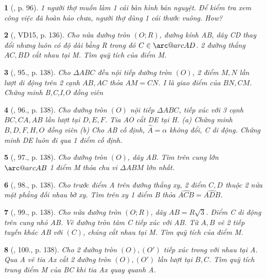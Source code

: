 \documentclass{article}
\makeatletter
\newcommand{\arc@char}{{\usefont{U}{tipa}{m}{n}\symbol{62}}}%
\newcommand{\arc}[1]{\mathpalette\arc@arc{#1}}
\newcommand{\arc@arc}[2]{%
	\sbox0{$\m@th#1#2$}%
	\vbox{
		\hbox{\resizebox{\wd0}{\height}{\arc@char}}
		\nointerlineskip
		\box0
	}%
}
\newtheorem{baitoan}{}
\makeatother
\begin{document}
\begin{baitoan}[\cite{Binh_boi_duong_Toan_9_tap_2}, p. 96]
	1 người thợ muốn làm 1 cái bàn hình bán nguyệt. Để kiểm tra xem công việc đã hoàn hảo chưa, người thợ dùng 1 cái thước vuông. How?
\end{baitoan}

\begin{baitoan}[\cite{Tuyen_Toan_9_old}, VD15, p. 136]
	Cho nửa đường tròn $(O;R)$, đường kính AB, dây CD thay đổi nhưng luôn có độ dài bằng R trong đó $C\in\arc{AD}$. 2 đường thẳng $AC,BD$ cắt nhau tại M. Tìm quỹ tích của điểm M.
\end{baitoan}

\begin{baitoan}[\cite{Tuyen_Toan_9_old}, 95., p. 138]
	Cho $\Delta ABC$ đều nội tiếp đường tròn $(O)$, 2 điểm $M,N$ lần lượt di động trên 2 cạnh $AB,AC$ thỏa $AM = CN$. I là giao điểm của $BN,CM$. Chứng minh B,C,I,O đồng viên
\end{baitoan}

\begin{baitoan}[\cite{Tuyen_Toan_9_old}, 96., p. 138]
	Cho đường tròn $(O)$ nội tiếp $\Delta ABC$, tiếp xúc với 3 cạnh $BC,CA,AB$ lần lượt tại $D,E,F$. Tia AO cắt DE tại H. (a) Chứng minh $B,D,F,H,O$ đồng viên (b) Cho AB cố định, $\widehat{A} = \alpha$ không đổi, C di động. Chứng minh DE luôn đi qua 1 điểm cố định.
\end{baitoan}

\begin{baitoan}[\cite{Tuyen_Toan_9_old}, 97., p. 138]
	Cho đường tròn $(O)$, dây AB. Tìm trên cung lớn $\arc{AB}$ 1 điểm M thỏa chu vi $\Delta ABM$ lớn nhất.
\end{baitoan}

\begin{baitoan}[\cite{Tuyen_Toan_9_old}, 98., p. 138]
	Cho trước điểm A trên đường thẳng xy, 2 điểm $C,D$ thuộc 2 nửa mặt phẳng đối nhau bờ xy. Tìm trên xy 1 điểm B thỏa $\widehat{ACB} = \widehat{ADB}$.
\end{baitoan}

\begin{baitoan}[\cite{Tuyen_Toan_9_old}, 99., p. 138]
	Cho nửa đường tròn $(O;R)$, dây $AB = R\sqrt{3}$. Điểm C di động trên cung nhỏ AB. Vẽ đường tròn tâm C tiếp xúc với AB. Từ $A,B$ vẽ 2 tiếp tuyến khác AB với $(C)$, chúng cắt nhau tại M. Tìm quỹ tích của điểm M.
\end{baitoan}

\begin{baitoan}[\cite{Tuyen_Toan_9_old}, 100., p. 138]
	Cho 2 đường tròn $(O),(O')$ tiếp xúc trong với nhau tại A. Qua A vẽ tia Ax cắt 2 đường tròn $(O),(O')$ lần lượt tại $B,C$. Tìm quỹ tích trung điểm M của BC khi tia Ax quay quanh A.
\end{baitoan}
\end{document}
